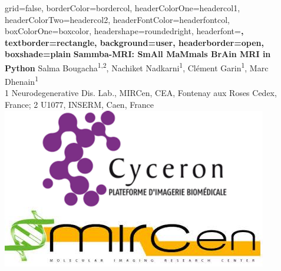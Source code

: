 \documentclass[a0paper,portrait]{baposter}
\begin{document}

\begin{poster}{
grid=false,
borderColor=bordercol, %
headerColorOne=headercol1, %
headerColorTwo=headercol2, %
headerFontColor=headerfontcol, %
boxColorOne=boxcolor, %
headershape=roundedright, %
headerfont=\Large\sf\bf, %
textborder=rectangle,
background=user,
headerborder=open, %
boxshade=plain
}
{}
%
%
{\sf\bf \LARGE{Sammba-MRI: SmAll MaMmals BrAin MRI in Python}} %
{\vspace{1em} Salma Bougacha{\textsuperscript{1,2}}, Nachiket Nadkarni\textsuperscript{1}, Cl\'ement Garin\textsuperscript{1}, Marc Dhenain\textsuperscript{1}\\ %
{\small 1  Neurodegenerative Dis. Lab., MIRCen, CEA, Fontenay aux Roses Cedex, France;
2  U1077, INSERM, Caen, France}} %
{\includegraphics[scale=0.4]{cyceron_mircen.png}} %


\end{poster}
\end{document}
